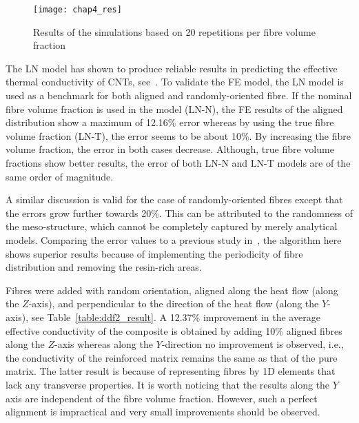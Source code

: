 \begin{figure}[!h]
\centering
\texttt{[image: chap4\_res]}
\caption{Results of the simulations based on 20 repetitions per fibre volume fraction}\label{figure:ddf2_res1}
\end{figure}%
	
	The LN model has shown to produce reliable results in predicting the effective thermal conductivity of CNTs, see~\autocite{Kostagiannakopoulou.2016,Zimmer.2012}. To validate the FE model, the LN model is used as a benchmark for both aligned and randomly-oriented fibre. If the nominal fibre volume fraction is used in the model (LN-N), the FE results of the aligned distribution show a maximum of 12.16\% error whereas by using the true fibre volume fraction (LN-T), the error seems to be about 10\%. By increasing the fibre volume fraction, the error in both cases decrease. Although, true fibre volume fractions show better results, the error of both LN-N and LN-T models are of the same order of magnitude. 
	
	A similar discussion is valid for the case of randomly-oriented fibres except that the errors grow further towards 20\%. This can be attributed to the randomness of the meso-structure, which cannot be completely captured by merely analytical models. Comparing the error values to a previous study in~\autocite{Javanbakht.2016}, the algorithm here shows superior results because of implementing the periodicity of fibre distribution and removing the resin-rich areas.

	Fibres were added with random orientation, aligned along the heat flow (along the $Z$-axis), and perpendicular to the direction of the heat flow (along the $Y$-axis), see Table~\ref{table:ddf2_result}. A 12.37\% improvement in the average effective conductivity of the composite is obtained by adding 10\% aligned fibres along the $Z$-axis whereas along the $Y$-direction no improvement is observed, i.e., the conductivity of the reinforced matrix remains the same as that of the pure matrix. The latter result is because of representing fibres by 1D elements that lack any transverse properties. It is worth noticing that the results along the $Y$ axis are independent of the fibre volume fraction. However, such a perfect alignment is impractical and very small improvements should be observed.


